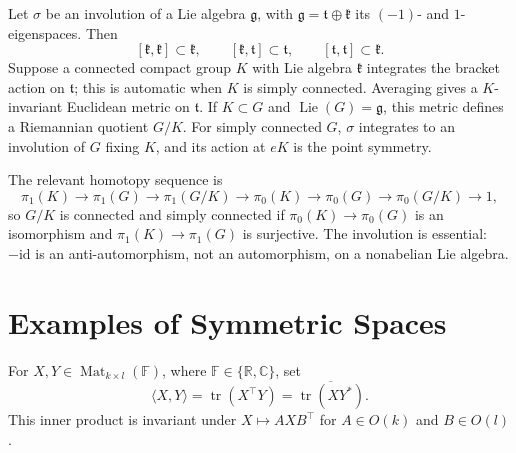 \begin{remark}
  \label{rem:pet-ch10-symmetric-space-from-involution}

  Let $\sigma$ be an involution of a Lie algebra $\mathfrak g$, with
  $\mathfrak g=\mathfrak t\oplus\mathfrak k$ its $(-1)$- and $1$-eigenspaces.
  Then
  \[
    [\mathfrak k,\mathfrak k]\subset\mathfrak k,\qquad
    [\mathfrak k,\mathfrak t]\subset\mathfrak t,\qquad
    [\mathfrak t,\mathfrak t]\subset\mathfrak k.
  \]
  Suppose a connected compact group $K$ with Lie algebra $\mathfrak k$
  integrates the bracket action on $\mathfrak t$; this is automatic when $K$
  is simply connected. Averaging gives a $K$-invariant Euclidean metric on
  $\mathfrak t$. If $K\subset G$ and $\operatorname{Lie}(G)=\mathfrak g$, this
  metric defines a Riemannian quotient $G/K$. For simply connected $G$,
  $\sigma$ integrates to an involution of $G$ fixing $K$, and its action at
  $eK$ is the point symmetry.

  The relevant homotopy sequence is
  \[
    \pi_1(K)\to\pi_1(G)\to\pi_1(G/K)\to\pi_0(K)\to\pi_0(G)\to\pi_0(G/K)\to1,
  \]
  so $G/K$ is connected and simply connected if
  $\pi_0(K)\to\pi_0(G)$ is an isomorphism and
  $\pi_1(K)\to\pi_1(G)$ is surjective. The involution is essential:
  $-\mathrm{id}$ is an anti-automorphism, not an automorphism, on a nonabelian
  Lie algebra.
\end{remark}

\section{Examples of Symmetric Spaces}

For $X,Y\in\operatorname{Mat}_{k\times l}(\mathbb F)$, where
$\mathbb F\in\{\mathbb R,\mathbb C\}$, set
\[
  \langle X,Y\rangle=\operatorname{tr}(X^\top Y)
  =\overline{\operatorname{tr}(XY^*)}.
\]
This inner product is invariant under $X\mapsto AXB^\top$ for $A\in O(k)$ and
$B\in O(l)$.

